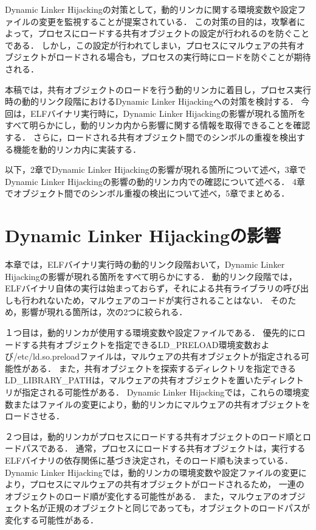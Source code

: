 \documentclass[submit,techreq,noauthor]{eco}	%
\begin{document}
  Dynamic Linker Hijackingの対策として，動的リンカに関する環境変数や設定ファイルの変更を監視することが提案されている\cite{MITRE-ATT&CK}．
  この対策の目的は，攻撃者によって，プロセスにロードする共有オブジェクトの設定が行われるのを防ぐことである．
  しかし，この設定が行われてしまい，プロセスにマルウェアの共有オブジェクトがロードされる場合も，プロセスの実行時にロードを防ぐことが期待される．

  本稿では，共有オブジェクトのロードを行う動的リンカに着目し，プロセス実行時の動的リンク段階におけるDynamic Linker Hijackingへの対策を検討する．
  今回は，ELFバイナリ実行時に，Dynamic Linker Hijackingの影響が現れる箇所をすべて明らかにし，動的リンカ内から影響に関する情報を取得できることを確認する．
  さらに，ロードされる共有オブジェクト間でのシンボルの重複を検出する機能を動的リンカ内に実装する．

  以下，2章でDynamic Linker Hijackingの影響が現れる箇所について述べ，3章でDynamic Linker Hijackingの影響の動的リンカ内での確認について述べる．
  4章でオブジェクト間でのシンボル重複の検出について述べ，5章でまとめる．\\

\section{Dynamic Linker Hijackingの影響}
  本章では，ELFバイナリ実行時の動的リンク段階おいて，Dynamic Linker Hijackingの影響が現れる箇所をすべて明らかにする．
  動的リンク段階では，ELFバイナリ自体の実行は始まっておらず，それによる共有ライブラリの呼び出しも行われないため，マルウェアのコードが実行されることはない．
  そのため，影響が現れる箇所は，次の2つに絞られる．
  
  １つ目は，動的リンカが使用する環境変数や設定ファイルである．
  優先的にロードする共有オブジェクトを指定できるLD\_PRELOAD環境変数および/etc/ld.so.preloadファイルは，マルウェアの共有オブジェクトが指定される可能性がある．
  また，共有オブジェクトを探索するディレクトリを指定できるLD\_LIBRARY\_PATHは，マルウェアの共有オブジェクトを置いたディレクトリが指定される可能性がある．
  Dynamic Linker Hijackingでは，これらの環境変数またはファイルの変更により，動的リンカにマルウェアの共有オブジェクトをロードさせる．

  ２つ目は，動的リンカがプロセスにロードする共有オブジェクトのロード順とロードパスである．
  通常，プロセスにロードする共有オブジェクトは，実行するELFバイナリの依存関係に基づき決定され，そのロード順も決まっている．
  Dynamic Linker Hijackingでは，動的リンカの環境変数や設定ファイルの変更により，プロセスにマルウェアの共有オブジェクトがロードされるため，
  一連のオブジェクトのロード順が変化する可能性がある．
  また，マルウェアのオブジェクト名が正規のオブジェクトと同じであっても，オブジェクトのロードパスが変化する可能性がある．\\
\end{document}

